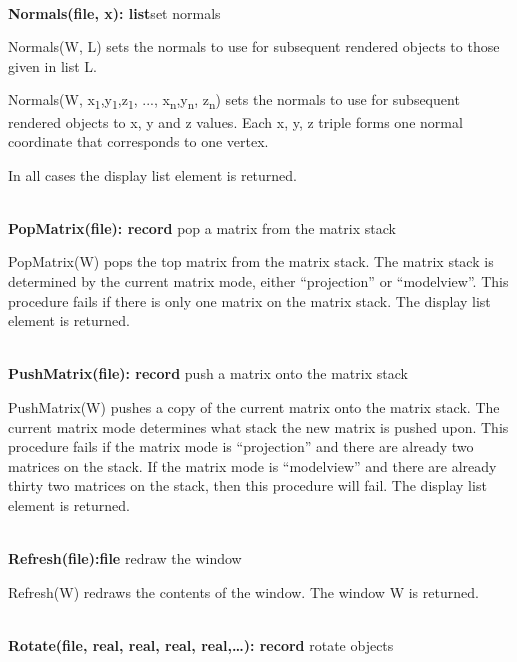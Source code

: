 \documentclass[letterpaper]{article}
\begin{document}
\noindent\hrulefill\\
\noindent\textsf{\textbf{Normals(file, x): list}}\hfill set normals

\textsf{Normals(W, L)} sets the normals to use for subsequent
rendered objects to those given in list L.

\textsf{Normals(W, x\textsubscript{1},y\textsubscript{1},z\textsubscript{1}, ..., x\textsubscript{n},y\textsubscript{n}, z\textsubscript{n})}
sets the normals to use for subsequent rendered objects to x, y and z
values. Each x, y, z triple forms one normal coordinate that corresponds
to one vertex.

In all cases the display list element is returned.

\noindent\hrulefill\\
\noindent\textsf{\textbf{PopMatrix(file): record}}
\hfill pop a matrix from the matrix stack


\bigskip

\textsf{PopMatrix(W)} pops the top matrix from the matrix stack. The matrix stack is determined by the current matrix
mode, either \textsf{{}``projection''} or \textsf{{}``modelview''.} This procedure fails if there is only one matrix on
the matrix stack. The display list element is returned.

\noindent\hrulefill\\
\noindent\textsf{\textbf{PushMatrix(file): record}}
\hfill push a matrix onto the matrix stack


\bigskip

\textsf{PushMatrix(W)} pushes a copy of the current matrix onto the
matrix stack. The current matrix mode determines what stack the new
matrix is pushed upon. This procedure fails if the matrix mode is
\textsf{{}``projection''} and there are already two matrices on the
stack. If the matrix mode is \textsf{{}``modelview''} and there are
already thirty two matrices on the stack, then this procedure will
fail. The display list element is returned.

\noindent\hrulefill\\
\noindent\textsf{\textbf{Refresh(file):file}} \hfill redraw the window


\bigskip

\textsf{Refresh(W)} redraws the contents of the window.
The window W is returned.

\noindent\hrulefill\\
\noindent\textsf{\textbf{Rotate(file, real, real, real, real,{\dots}): record}}
\hfill rotate objects
\end{document}
